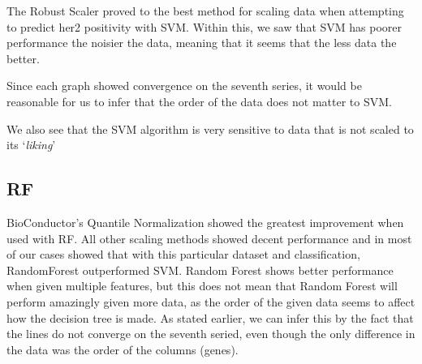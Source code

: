 \documentclass[11pt]{article}
\begin{document}
The Robust Scaler proved to the best method for scaling data when
attempting to predict her2 positivity with SVM. Within this, we saw that
SVM has poorer performance the noisier the data, meaning that it seems
that the less data the better.

Since each graph showed convergence on the seventh series, it would be
reasonable for us to infer that the order of the data does not matter to
SVM.

We also see that the SVM algorithm is very sensitive to data that is not
scaled to its `\emph{liking}'

\hypertarget{rf}{%
\subsection{RF}\label{rf}}

BioConductor's Quantile Normalization showed the greatest improvement
when used with RF. All other scaling methods showed decent performance
and in most of our cases showed that with this particular dataset and
classification, RandomForest outperformed SVM. Random Forest shows
better performance when given multiple features, but this does not mean
that Random Forest will perform amazingly given more data, as the order
of the given data seems to affect how the decision tree is made. As
stated earlier, we can infer this by the fact that the lines do not
converge on the seventh seried, even though the only difference in the
data was the order of the columns (genes).


    
    
    
    
\end{document}

